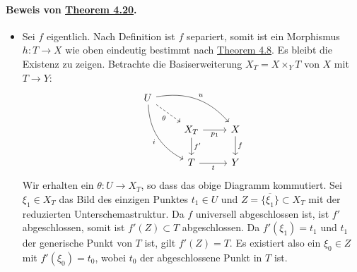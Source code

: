 \documentclass[11pt,b5paper,openany]{memoir}
\begin{document}
\paragraph{Beweis von \hyperref[4.20]{Theorem 4.20}.}\begin{itemize}
\item Sei $f$ eigentlich. Nach Definition ist $f$ separiert, somit ist ein Morphismus $h:T\to X$ wie oben eindeutig bestimmt nach \hyperref[4.8]{Theorem 4.8}. Es bleibt die Existenz zu zeigen. Betrachte die Basiserweiterung $X_T=X\times_YT$ von $X$ mit $T\to Y$:
\[\begin{tikzcd}
U \ar[dr, "\theta"', dashed]\ar[rrd, "u", bend left]\ar[ddr, "i"', bend right] &&\\
& X_T\ar[r, "p_1"']\ar[d, "f'"] & X\ar[d, "f"]\\
& T\ar[r, "t"'] & Y
\end{tikzcd} \]
Wir erhalten ein $\theta:U\to X_T$, so dass das obige Diagramm kommutiert. Sei $\xi_1\in X_T$ das Bild des einzigen Punktes $t_1\in U$ und $Z=\overline{\{\xi_1\}}\subset X_T$ mit der reduzierten Unterschemastruktur. Da $f$ universell abgeschlossen ist, ist $f'$ abgeschlossen, somit ist $f'(Z)\subset T$ abgeschlossen. Da $f'(\xi_1)=t_1$ und $t_1$ der generische Punkt von $T$ ist, gilt $f'(Z)=T$. Es existiert also ein $\xi_0\in Z$ mit $f'(\xi_0)=t_0$, wobei $t_0$ der abgeschlossene Punkt in $T$ ist. 


\end{itemize}
\end{document}
